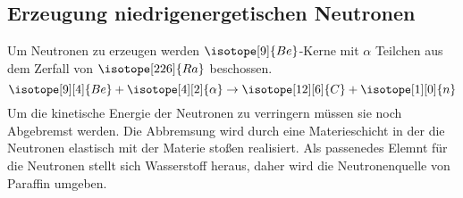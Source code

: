 \subsection{Erzeugung niedrigenergetischen Neutronen}
Um Neutronen zu erzeugen werden $\isotope[9]{Be}$-Kerne mit $\alpha$ Teilchen aus dem Zerfall von $\isotope[226]{Ra}$ beschossen.
\begin{equation}
    \isotope[9][4]{Be} + \isotope[4][2]{\alpha} \to \isotope[12][6]{C} + \isotope[1][0]{n}
\end{equation}
Um die kinetische Energie der Neutronen zu verringern müssen sie noch Abgebremst werden.
Die Abbremsung wird durch eine Materieschicht in der die Neutronen elastisch mit der Materie stoßen realisiert.
Als passenedes Elemnt für die Neutronen stellt sich Wasserstoff heraus, daher wird die Neutronenquelle von Paraffin umgeben.